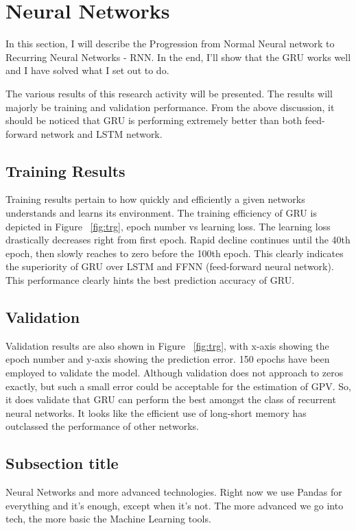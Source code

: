 \section{Neural Networks}

In this section, I will describe the Progression from Normal Neural network to Recurring Neural Networks - RNN. In the end, I'll show that the GRU works well and I have solved what I set out to do. 


The various results of this research activity will be presented. The results will majorly be training and validation performance. From the above discussion, it should be noticed that GRU is performing extremely better than both feed-forward network and LSTM network.  

\subsection{Training Results}

Training results pertain to how quickly and efficiently a given networks understands and learns its environment. The training efficiency of GRU is depicted in Figure ~\ref{fig:trg}, epoch number vs learning loss. The learning loss drastically decreases right from first epoch. Rapid decline continues until the 40th epoch, then slowly reaches to zero before the 100th epoch. This clearly indicates the superiority of GRU over LSTM and FFNN (feed-forward neural network). This performance clearly hints the best prediction accuracy of GRU.  



\subsection{Validation}

Validation results are also shown in Figure ~\ref{fig:trg}, with x-axis showing the epoch number and y-axis showing the prediction error. 150 epochs have been employed to validate the model. Although validation does not approach to zeros exactly, but such a small error could be acceptable for the estimation of GPV. So, it does validate that GRU can perform the best amongst the class of recurrent neural networks. It looks like the efficient use of long-short memory has outclassed the performance of other networks. 


\subsection{Subsection title}
Neural Networks and more advanced technologies. Right now we use Pandas for everything and it's enough, except when it's not. The more advanced we go into tech, the more basic the Machine Learning tools.

